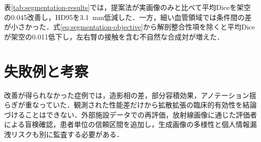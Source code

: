 表\ref{tab:segmentation-results}では，提案法が実画像のみと比べて平均Diceを架空の0.045改善し，HD95を\SI{3.1}{mm}低減した．一方，細い血管領域では条件間の差が小さかった．式\eqref{eq:segmentation-objective}から解剖整合性項を除くと平均Diceが架空の0.011低下し，左右腎の接触を含む不自然な合成対が増えた．

\section{失敗例と考察}
改善が得られなかった症例では，造影相の差，部分容積効果，アノテーション揺らぎが重なっていた．観測された性能差だけから拡散拡張の臨床的有効性を結論づけることはできない．外部施設データでの再評価，放射線画像に通じた評価者による盲検確認，患者単位の信頼区間を追加し，生成画像の多様性と個人情報漏洩リスクも別に監査する必要がある．
